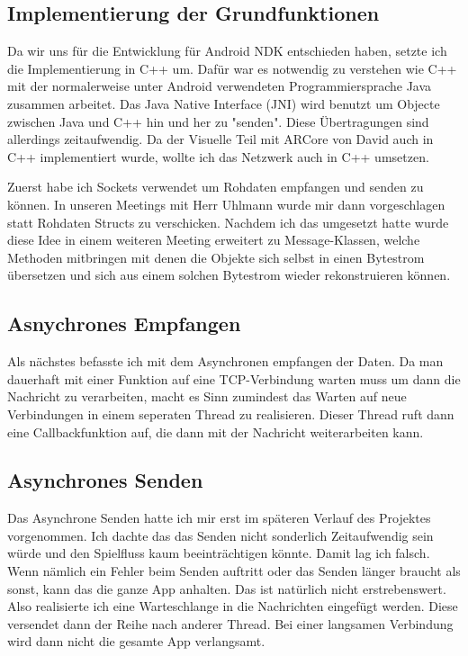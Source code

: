 \subsection{Implementierung der Grundfunktionen}
Da wir uns für die Entwicklung für Android NDK entschieden haben, setzte ich die Implementierung in C++ um.
Dafür war es notwendig zu verstehen wie C++ mit der normalerweise unter Android verwendeten Programmiersprache Java
zusammen arbeitet.
Das Java Native Interface (JNI) wird benutzt um Objecte zwischen Java und C++ hin und her zu "senden". Diese Übertragungen sind allerdings
zeitaufwendig. Da der Visuelle Teil mit ARCore von David auch in C++ implementiert wurde, wollte ich das Netzwerk auch in C++ umsetzen.
\par
Zuerst habe ich Sockets verwendet um Rohdaten empfangen und senden zu können.
In unseren Meetings mit Herr Uhlmann wurde mir dann vorgeschlagen statt Rohdaten Structs zu verschicken.
Nachdem ich das umgesetzt hatte wurde diese Idee in einem weiteren Meeting erweitert zu Message-Klassen, welche Methoden mitbringen
mit denen die Objekte sich selbst in einen Bytestrom übersetzen und sich aus einem solchen Bytestrom wieder rekonstruieren können.
\subsection{Asnychrones Empfangen}
Als nächstes befasste ich mit dem Asynchronen empfangen der Daten. Da man dauerhaft mit einer Funktion auf eine TCP-Verbindung warten muss
um dann die Nachricht zu verarbeiten, macht es Sinn zumindest das Warten auf neue Verbindungen in einem seperaten Thread zu realisieren.
Dieser Thread ruft dann eine Callbackfunktion auf, die dann mit der Nachricht weiterarbeiten kann.
\subsection{Asynchrones Senden}
Das Asynchrone Senden hatte ich mir erst im späteren Verlauf des Projektes vorgenommen. Ich dachte das das Senden nicht sonderlich
Zeitaufwendig sein würde und den Spielfluss kaum beeinträchtigen könnte. Damit lag ich falsch. Wenn nämlich ein Fehler beim Senden
auftritt oder das Senden länger braucht als sonst, kann das die ganze App anhalten. Das ist natürlich nicht erstrebenswert.
Also realisierte ich eine Warteschlange in die Nachrichten eingefügt werden. Diese versendet dann der Reihe nach anderer Thread.
Bei einer langsamen Verbindung wird dann nicht die gesamte App verlangsamt.
